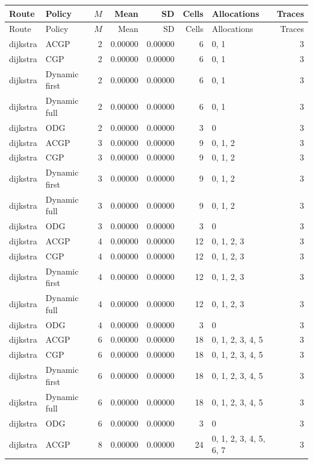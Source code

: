\documentclass[10pt,a4paper]{article}
\begin{document}
\tiny\setlength{\tabcolsep}{2pt}\begin{longtable}{@{}p{23mm}p{29mm}rrrrp{36mm}r@{}}
\toprule Route & Policy & $M$ & Mean & SD & Cells & Allocations & Traces \\ \midrule\endfirsthead
\toprule Route & Policy & $M$ & Mean & SD & Cells & Allocations & Traces \\ \midrule\endhead
\bottomrule\endfoot
dijkstra & ACGP & 2 & 0.00000 & 0.00000 & 6 & 0, 1 & 3 \\
dijkstra & CGP & 2 & 0.00000 & 0.00000 & 6 & 0, 1 & 3 \\
dijkstra & Dynamic first & 2 & 0.00000 & 0.00000 & 6 & 0, 1 & 3 \\
dijkstra & Dynamic full & 2 & 0.00000 & 0.00000 & 6 & 0, 1 & 3 \\
dijkstra & ODG & 2 & 0.00000 & 0.00000 & 3 & 0 & 3 \\
dijkstra & ACGP & 3 & 0.00000 & 0.00000 & 9 & 0, 1, 2 & 3 \\
dijkstra & CGP & 3 & 0.00000 & 0.00000 & 9 & 0, 1, 2 & 3 \\
dijkstra & Dynamic first & 3 & 0.00000 & 0.00000 & 9 & 0, 1, 2 & 3 \\
dijkstra & Dynamic full & 3 & 0.00000 & 0.00000 & 9 & 0, 1, 2 & 3 \\
dijkstra & ODG & 3 & 0.00000 & 0.00000 & 3 & 0 & 3 \\
dijkstra & ACGP & 4 & 0.00000 & 0.00000 & 12 & 0, 1, 2, 3 & 3 \\
dijkstra & CGP & 4 & 0.00000 & 0.00000 & 12 & 0, 1, 2, 3 & 3 \\
dijkstra & Dynamic first & 4 & 0.00000 & 0.00000 & 12 & 0, 1, 2, 3 & 3 \\
dijkstra & Dynamic full & 4 & 0.00000 & 0.00000 & 12 & 0, 1, 2, 3 & 3 \\
dijkstra & ODG & 4 & 0.00000 & 0.00000 & 3 & 0 & 3 \\
dijkstra & ACGP & 6 & 0.00000 & 0.00000 & 18 & 0, 1, 2, 3, 4, 5 & 3 \\
dijkstra & CGP & 6 & 0.00000 & 0.00000 & 18 & 0, 1, 2, 3, 4, 5 & 3 \\
dijkstra & Dynamic first & 6 & 0.00000 & 0.00000 & 18 & 0, 1, 2, 3, 4, 5 & 3 \\
dijkstra & Dynamic full & 6 & 0.00000 & 0.00000 & 18 & 0, 1, 2, 3, 4, 5 & 3 \\
dijkstra & ODG & 6 & 0.00000 & 0.00000 & 3 & 0 & 3 \\
dijkstra & ACGP & 8 & 0.00000 & 0.00000 & 24 & 0, 1, 2, 3, 4, 5, 6, 7 & 3 \\

\end{longtable}
\end{document}
